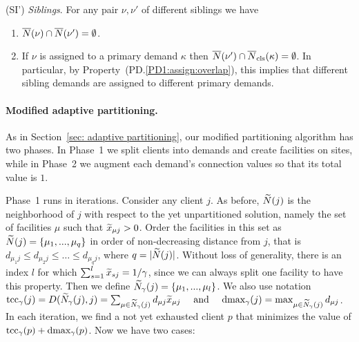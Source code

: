 \documentclass{llncs}
\begin{document}
\begin{description}
\begin{enumerate}
	\end{enumerate}
	
\item{(SI')} \emph{Siblings}. For any pair $\nu,\nu'$ of different siblings we have
  \begin{enumerate}

	\item \label{SI1:siblings disjoint}
		  ${\overline{N}}(\nu)\cap {\overline{N}}(\nu') = \emptyset$.
		
	\item \label{SI1:primary disjoint} If $\nu$ is assigned to a primary demand $\kappa$ then
 		${\overline{N}}(\nu')\cap {\overline{N}}_{\text{cls}}(\kappa) = \emptyset$. In particular, by Property~(PD.\ref{PD1:assign:overlap}),
		this implies that different sibling demands are assigned to different primary demands.

	\end{enumerate}
	
\end{description}


\paragraph{Modified adaptive partitioning.}
 As in Section~\ref{sec: adaptive partitioning}, our modified partitioning algorithm
has two phases.
In Phase~1 we split clients into demands and create facilities on
sites, while in Phase~2 we augment each demand's
connection values so that its total value is $1$.

Phase~1 runs in iterations. Consider any client $j$.  As before,
${\widetilde N}(j)$ is the neighborhood of $j$ with respect to the yet
unpartitioned solution, namely the set of facilities $\mu$ such that
${\widetilde x}_{\mu j}>0$. Order the facilities in this set as
${\widetilde N}(j) = { \left\{ \mu_1,...,\mu_q \right\} }$ in order of non-decreasing
distance from $j$, that is
$d_{\mu_1 j} \leq d_{\mu_2 j} \leq \ldots \leq d_{\mu_q j}$, where
$q = |{\widetilde N}(j)|$. Without loss of generality, there is an index
$l$ for which $\sum_{s=1}^l {\widetilde x}_{s j} = 1/\gamma$, since we can
always split one facility to have this property. Then we define
${\widetilde N}_{\gamma}(j) = { \left\{ \mu_1,...,\mu_l \right\} }$. We also use notation
%
$
\textrm{tcc}_\gamma(j) =  D({\widetilde N}_\gamma(j), j) = \sum_{\mu\in{\widetilde N}_{\gamma}(j)} d_{\mu j} {\widetilde x}_{\mu j}
			\quad\textrm{ and }\quad
 \text{dmax}_\gamma(j) = \max_{\mu \in {\widetilde N}_{\gamma}(j)} d_{\mu j}
$.
%
In each iteration, we find a not yet exhausted client $p$ that minimizes the
value of $\textrm{tcc}_\gamma(p) + \text{dmax}_\gamma(p)$. Now we have two cases:
\end{document}
